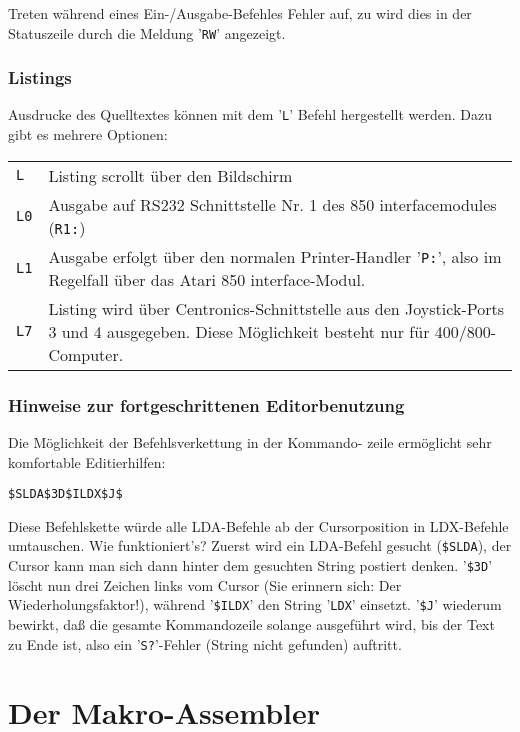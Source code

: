 \documentclass[10pt,a4paper,twoside,final,openright,titlepage]{memoir}
\newcommand{\key}[1]{\keystroke{\tiny #1}}
\begin{document}
Treten während eines Ein-/Ausgabe-Befehles Fehler auf,
zu wird dies in der Statuszeile durch die Meldung '\texttt{RW}'
angezeigt.

\subsection{Listings}

Ausdrucke des Quelltextes können mit dem '\texttt{L}' Befehl
hergestellt werden. Dazu gibt es mehrere Optionen:

\begin{tabular}{lp{25em}}
\texttt{L}  & 	Listing scrollt über den Bildschirm \\
\texttt{L0} & 	Ausgabe auf RS232 Schnittstelle Nr. 1 des 850
	interfacemodules (\texttt{R1:}) \\
\texttt{L1} & 	Ausgabe erfolgt über den normalen Printer-Handler
	'\texttt{P:}', also im Regelfall über das Atari 850
	interface-Modul. \\
\texttt{L7} & 	Listing wird über Centronics-Schnittstelle aus
	den Joystick-Ports 3 und 4 ausgegeben. Diese
	Möglichkeit besteht nur für 400/800-Computer. \\
\end{tabular}

\subsection{Hinweise zur fortgeschrittenen Editorbenutzung}

Die Möglichkeit der Befehlsverkettung in der Kommando-
zeile ermöglicht sehr komfortable Editierhilfen:

\par
\bigskip
	\texttt{\$SLDA\$3D\$ILDX\$J\$}\key{ESC}
\par
\bigskip

Diese Befehlskette würde alle LDA-Befehle ab der
Cursorposition in LDX-Befehle umtauschen. Wie
funktioniert's? Zuerst wird ein LDA-Befehl gesucht
(\texttt{\$SLDA}), der Cursor kann man sich dann hinter dem
gesuchten String postiert denken. '\texttt{\$3D}' löscht nun
drei Zeichen links vom Cursor (Sie erinnern sich: Der
Wiederholungsfaktor!), während '\texttt{\$ILDX}' den String '\texttt{LDX}'
einsetzt. '\texttt{\$J}' wiederum bewirkt, daß die gesamte
Kommandozeile solange ausgeführt wird, bis der Text zu
Ende ist, also ein '\texttt{S?}'-Fehler (String nicht gefunden)
auftritt.

\chapter{Der Makro-Assembler}
\end{document}
